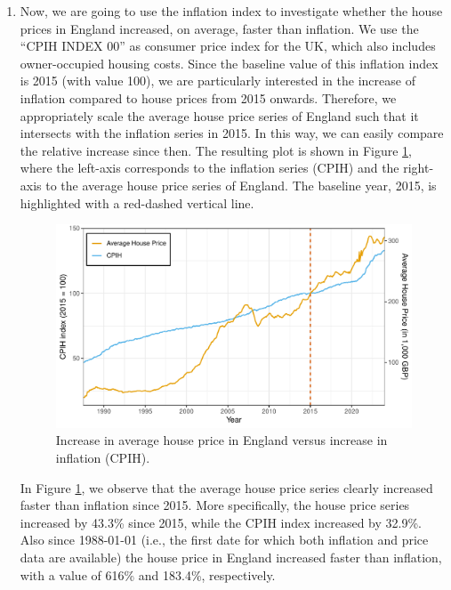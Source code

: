 \documentclass[a4paper,11pt]{article}\usepackage[]{graphicx}\usepackage[]{xcolor}
\newenvironment{knitrout}{}{} %
\begin{document}
\begin{enumerate}
\item Now, we are going to use the inflation index to investigate whether the house prices in England increased, on average, faster than inflation. We use the “CPIH INDEX 00” as consumer price index for the UK, which also includes owner-occupied housing costs. Since the baseline value of this inflation index is 2015 (with value 100), we are particularly interested in the increase of inflation compared to house prices from 2015 onwards. Therefore, we appropriately scale the average house price series of England such that it intersects with the inflation series in 2015. In this way, we can easily compare the relative increase since then. The resulting plot is shown in Figure \ref{fig:plot_inflation}, where the left-axis corresponds to the inflation series (CPIH) and the right-axis to the average house price series of England. The baseline year, 2015, is highlighted with a red-dashed vertical line.

\begin{knitrout}
\color{fgcolor}\begin{figure}[H]

{\centering \includegraphics[width=0.8\linewidth]{figure/plot_inflation-1} 

}

\caption[Increase in average house price in England versus increase in inflation (CPIH)]{Increase in average house price in England versus increase in inflation (CPIH).}\label{fig:plot_inflation}
\end{figure}

\end{knitrout}

In Figure \ref{fig:plot_inflation}, we observe that the average house price series clearly increased faster than inflation since 2015. More specifically, the house price series increased by 43.3\% since 2015, while the CPIH index increased by 32.9\%. Also since 1988-01-01 (i.e., the first date for which both inflation and price data are available) the house price in England increased faster than inflation, with a value of 616\% and 183.4\%, respectively. 





\end{enumerate}
\end{document}
